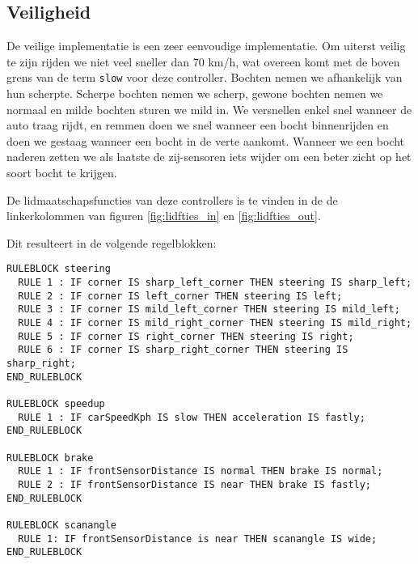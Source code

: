 \subsection{Veiligheid}
De veilige implementatie is een zeer eenvoudige implementatie. Om uiterst veilig
te zijn rijden we niet veel sneller dan 70 km/h, wat overeen komt met de boven grens van de term \texttt{slow} voor deze controller. Bochten nemen we afhankelijk van hun scherpte. Scherpe bochten nemen we scherp, gewone bochten nemen we
normaal en milde bochten sturen we mild in. We versnellen enkel snel wanneer de
auto traag rijdt, en remmen doen we snel wanneer een bocht binnenrijden en doen
we gestaag wanneer een bocht in de verte aankomt. Wanneer we een bocht naderen
zetten we als laatste de zij-sensoren iets wijder om een beter zicht op het soort
bocht te krijgen.

De lidmaatschapsfuncties van deze controllers is te vinden in de de linkerkolommen 
van figuren \ref{fig:lidfties_in} en \ref{fig:lidfties_out}.

Dit resulteert in de volgende regelblokken:

\begin{lstlisting}
RULEBLOCK steering
  RULE 1 : IF corner IS sharp_left_corner THEN steering IS sharp_left;
  RULE 2 : IF corner IS left_corner THEN steering IS left;
  RULE 3 : IF corner IS mild_left_corner THEN steering IS mild_left;
  RULE 4 : IF corner IS mild_right_corner THEN steering IS mild_right;
  RULE 5 : IF corner IS right_corner THEN steering IS right;
  RULE 6 : IF corner IS sharp_right_corner THEN steering IS sharp_right;
END_RULEBLOCK

RULEBLOCK speedup
  RULE 1 : IF carSpeedKph IS slow THEN acceleration IS fastly;
END_RULEBLOCK

RULEBLOCK brake
  RULE 1 : IF frontSensorDistance IS normal THEN brake IS normal;
  RULE 2 : IF frontSensorDistance IS near THEN brake IS fastly;
END_RULEBLOCK

RULEBLOCK scanangle
  RULE 1: IF frontSensorDistance is near THEN scanangle IS wide;
END_RULEBLOCK
\end{lstlisting}
